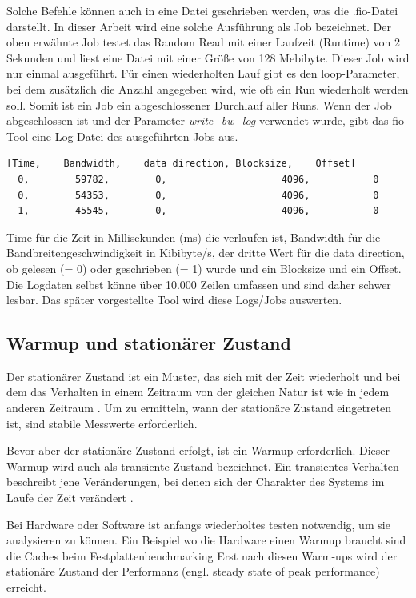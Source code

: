Solche Befehle können auch in eine Datei geschrieben werden, was die .fio-Datei darstellt. 
In dieser Arbeit wird eine solche Ausführung als Job bezeichnet.
Der oben erwähnte Job testet das Random Read mit einer Laufzeit (Runtime) von 2 Sekunden und liest eine Datei mit einer Größe von 128 Mebibyte. 
Dieser Job wird nur einmal ausgeführt. Für einen wiederholten Lauf gibt es den loop-Parameter, bei dem zusätzlich die Anzahl angegeben wird, 
wie oft ein Run wiederholt werden soll. Somit ist ein Job ein abgeschlossener Durchlauf aller Runs.
Wenn der Job abgeschlossen ist und der Parameter \textit{write\_bw\_log} verwendet wurde, gibt das fio-Tool eine Log-Datei des ausgeführten Jobs aus.

\begin{lstlisting}[caption=Erste Zeilen des Logs (Bezeichnungen sind nicht im Log enthalten),label={lst:log_line_example}]
  [Time,	Bandwidth,    data direction, Blocksize,	Offset]
  0, 	    59782,        0,		            4096,		    0
  0, 	    54353,        0,		            4096,		    0
  1, 	    45545,        0,		            4096,		    0
\end{lstlisting}

Time für die Zeit in Millisekunden (ms) die verlaufen ist, Bandwidth für die
Bandbreitengeschwindigkeit in Kibibyte/s, der dritte Wert für die data direction,
 ob gelesen (= 0) oder geschrieben (= 1) wurde und ein Blocksize und
ein Offset. Die Logdaten selbst könne über 10.000 Zeilen umfassen und sind
daher schwer lesbar. Das später vorgestellte Tool wird diese Logs/Jobs auswerten.

\subsection{Warmup und stationärer Zustand}
Der stationärer Zustand ist ein Muster, das sich mit der Zeit wiederholt und bei dem das Verhalten in einem Zeitraum von der 
gleichen Natur ist wie in jedem anderen Zeitraum \cite{transient_state_definition}. Um zu ermitteln,
wann der stationäre Zustand eingetreten ist, sind stabile Messwerte erforderlich.

Bevor aber der stationäre Zustand erfolgt, ist ein Warmup erforderlich.
Dieser Warmup wird auch als transiente Zustand bezeichnet.
Ein transientes Verhalten beschreibt jene Veränderungen, bei denen sich der Charakter des Systems im Laufe der Zeit verändert \cite{transient_state_definition}.

Bei Hardware oder Software ist anfangs wiederholtes testen notwendig, um
sie analysieren zu können. 
Ein Beispiel wo die Hardware einen Warmup braucht sind die Caches beim Festplattenbenchmarking \cite{nine-year-of-bench}
Erst nach diesen Warm-ups wird der
stationäre Zustand der Performanz (engl. steady state of peak performance)
erreicht.

